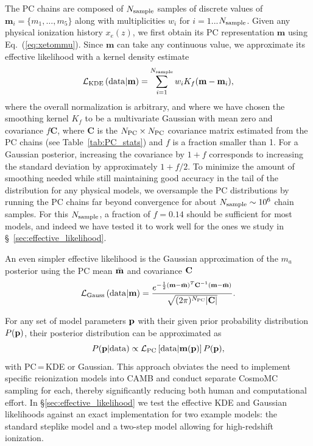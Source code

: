 \documentclass[aps,prd,twocolumn,amsmath,amssymb,showpacs,floatfix,superscriptaddress,nofootinbib]{revtex4-1}
\newcommand{\sample}{{\rm sample}}
\newcommand{\beq}{\begin{equation}}
\newcommand{\eeq}{\end{equation}}
\begin{document}
The PC chains are composed of $N_{\rm sample}$ samples of discrete values of $\mathbf{m}_i = \{m_1, \ldots, m_5\}$ along with multiplicities $w_i$ for $i = 1$...$N_{\rm sample}$. Given any physical ionization history $x_e(z)$, we first obtain its PC representation $\mathbf{m}$ using Eq.~(\ref{eq:xetommu}). Since $\mathbf{m}$ can take any continuous value, we approximate its effective likelihood with a kernel density estimate
\beq
{\cal L}_{\rm KDE}\left({\rm data}|\mathbf{m} \right)  = \sum_{i = 1}^{N_{\rm sample}} w_i K_f(\mathbf{m}-\mathbf{m}_i),
\eeq
where the overall normalization is arbitrary, and where we have chosen the smoothing kernel $K_f$ to be a  multivariate Gaussian with mean zero and covariance $f\mathbf{C}$, where $\mathbf{C}$ is the $N_{\rm PC} \times N_{\rm PC}$ covariance matrix estimated from the PC chains (see Table~\ref{tab:PC_stats}) and $f$ is a fraction smaller than 1.
For a Gaussian posterior, increasing the covariance by $1+f$ corresponds to increasing the standard deviation by approximately $1+f/2$. To minimize the amount of smoothing needed while still maintaining good accuracy in the tail of the distribution for any physical models, we oversample the PC distributions by running the PC chains far beyond convergence for about $N_{\sample} \sim 10^6$ chain samples. 
For this $N_{\sample}$, a fraction of $f = 0.14$ should be sufficient for most models, and indeed we have tested it to work well for the ones we study in \S~\ref{sec:effective_likelihood}.

An even simpler effective likelihood is the Gaussian approximation of the $m_a$ posterior using the PC mean $\bar{\bf m}$ and covariance $\bf C$
%
\begin{equation}
 {\cal L}_{\rm Gauss}\left({\rm data}|\mathbf{m} \right) = \frac{ e^{-\frac{1}{2} ({\bf m}-\bar{\bf m})^T {\bf C}^{-1} ({\bf m}-\bar{\bf m}) } }{\sqrt{(2\pi)^{N_{\rm PC}} | \mathbf{C}| }}.
 \label{eq:gaussian}
 \end{equation}
%

For any set of model parameters ${\bf p}$ with their given prior probability distribution
$P({\bf p})$, their posterior distribution can be approximated as 
\begin{equation}
P({\bf p}| {\rm data}) \propto {\cal L}_{\rm PC}\left[ {\rm data}|\mathbf{m}(\bf p) \right] P(\bf p),
\end{equation}
with PC\,=\,KDE or Gaussian.
This approach obviates the need to implement specific reionization models into CAMB and conduct separate CosmoMC sampling for each, thereby significantly reducing both human and computational effort.
In \S\ref{sec:effective_likelihood} we test the effective KDE and Gaussian likelihoods against an exact implementation
for two example models: the standard steplike model and a two-step model allowing for high-redshift ionization.
\end{document}
